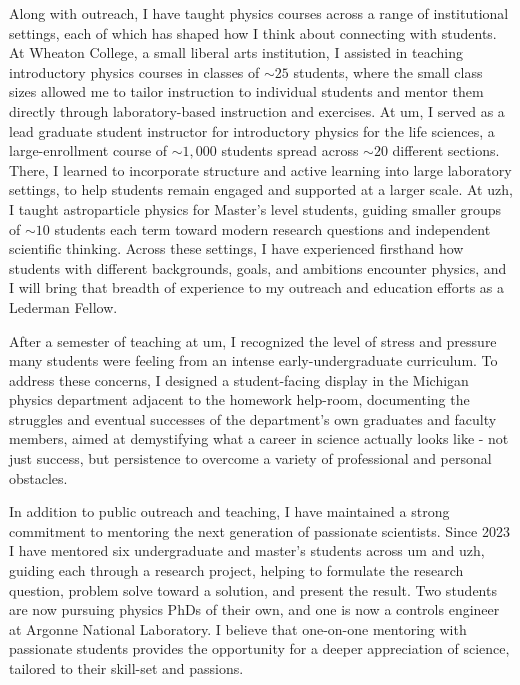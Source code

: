 \documentclass[11pt]{article}
\newcommand{\TODO}[1]{%
  \marginnote{\color{red}\textbf{TODO}}%
  {\color{red}#1}%
}
\begin{document}
Along with outreach, I have taught physics courses across a range of institutional settings, each of which has shaped how I think about connecting with students. 
At Wheaton College, a small liberal arts institution, I assisted in teaching introductory physics courses in classes of $\sim25$ students, where the small class sizes allowed me to tailor instruction to individual students and mentor them directly through laboratory-based instruction and exercises. 
At \ac{um}, I served as a lead graduate student instructor for introductory physics for the life sciences, a large-enrollment course of $\sim1,000$ students spread across $\sim20$ different sections. There, I learned to incorporate structure and active learning into large laboratory settings, to help students remain engaged and supported at a larger scale. 
At \ac{uzh}, I taught astroparticle physics for Master’s level students, guiding smaller groups of $\sim10$ students each term toward modern research questions and independent scientific thinking. 
Across these settings, I have experienced firsthand how students with different backgrounds, goals, and ambitions encounter physics, and I will bring that breadth of experience to my outreach and education efforts as a Lederman Fellow.

After a semester of teaching at \ac{um}, I recognized the level of stress and pressure many students were feeling from an intense early-undergraduate curriculum.
To address these concerns, I designed a student-facing display in the Michigan physics department adjacent to the homework help-room, documenting the struggles and eventual successes of the department's own graduates and faculty members, aimed at demystifying what a career in science actually looks like - not just success, but persistence to overcome a variety of professional and personal obstacles. %

In addition to public outreach and teaching, I have maintained a strong commitment to mentoring the next generation of passionate scientists.
Since 2023 I have mentored six undergraduate and master's students across \ac{um} and \ac{uzh},
guiding each through a research project, helping to formulate the research question, problem solve toward a solution, and present the result. Two students are now pursuing physics PhDs of their own,
and one is now a controls engineer at Argonne National Laboratory. I believe that one-on-one mentoring with passionate students provides the opportunity for a deeper appreciation of science, tailored to their skill-set and passions. %
\end{document}
